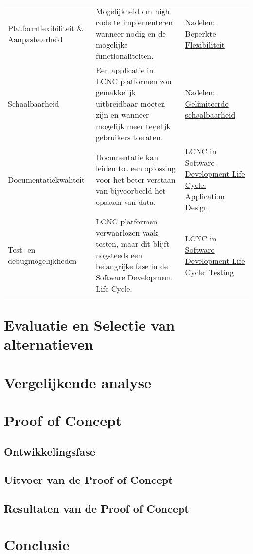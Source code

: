 \begin{longtable}{lp{4.4cm}p{3.4cm}}
    Platformflexibiliteit \& Aanpasbaarheid & Mogelijkheid om high code te implementeren wanneer nodig en de mogelijke functionaliteiten. & \hyperref[subsec:beperkte-flexibiliteit]{Nadelen: Beperkte Flexibiliteit} \\
    Schaalbaarheid & Een applicatie in LCNC platformen zou gemakkelijk uitbreidbaar moeten zijn en wanneer mogelijk meer tegelijk gebruikers toelaten. & \hyperref[subsec:gelimiteerde-schaalbaarheid]{Nadelen: Gelimiteerde schaalbaarheid} \\
    Documentatiekwaliteit &  Documentatie kan leiden tot een oplossing voor het beter verstaan van bijvoorbeeld het opslaan van data. & \hyperref[subsec:lcnc-binnen-agile]{LCNC in Software Development Life Cycle: Application Design} \\
    Test- en debugmogelijkheden  & LCNC platformen verwaarlozen vaak testen, maar dit blijft nogsteeds een belangrijke fase in de Software Development Life Cycle.  &  \hyperref[subsec:lcnc-binnen-agile]{LCNC in Software Development Life Cycle: Testing}\\
\end{longtable}








\section*{Evaluatie en Selectie van alternatieven}
\label{sec:evaluatie-en-selectie-van-alternatieven}

\section*{Vergelijkende analyse}
\label{sec:vergelijkende-analyse}

\section*{Proof of Concept}
\label{sec:proof-of-concept}
\subsection*{Ontwikkelingsfase}
\subsection*{Uitvoer van de Proof of Concept}
\subsection*{Resultaten van de Proof of Concept}

\section*{Conclusie}

